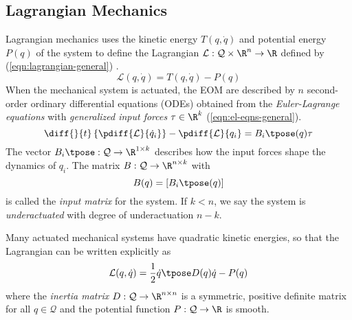 \subsection{Lagrangian Mechanics}

Lagrangian mechanics uses the kinetic energy \(T(q,\dot{q})\) and potential
energy \(P(q)\) of the system to define the Lagrangian 
\(\mathcal{L} : \mathcal{Q}\times\R^n \rightarrow \R\) defined by
(\ref{eqn:lagrangian-general}) \cite{greenwood_dynamics}.
\begin{equation}\label{eqn:lagrangian-general}
    \mathcal{L}(q,\dot{q}) = T(q,\dot{q}) - P(q)
\end{equation}
When the mechanical system is actuated, the EOM are described by \(n\) second-order
ordinary differential equations (ODEs) obtained from the \textit{Euler-Lagrange
equations} with \textit{generalized input forces} \(\tau \in \R^k\) 
(\ref{eqn:el-eqns-general}). 
\begin{equation}\label{eqn:el-eqns-general}
    \diff{}{t}\left\{ \pdiff{\mathcal{L}}{\dot{q}_i} \right\}
    - \pdiff{\mathcal{L}}{q_i} = B_i\tpose(q) \tau
\end{equation}
The vector \(B_i\tpose: \mathcal{Q} \rightarrow \R^{1\times k}\) describes how
the input forces shape the dynamics of \(q_i\).
The matrix  \(B: \mathcal{Q} \rightarrow \R^{n \times k}\) with
\[
    B(q) = [B_i\tpose(q)]
\]
is called the \textit{input matrix} for the system.
If \(k < n\), we say the system is \textit{underactuated} with degree of
underactuation \(n - k\).

Many actuated mechanical systems have quadratic kinetic energies, so that the
Lagrangian can be written explicitly as
\begin{equation}\label{eqn:lagrangian}
    \mathcal{L}(q,\dot{q}) = \frac{1}{2} \dot{q}\tpose D(q) \dot{q} - P(q)
\end{equation}
where the \textit{inertia matrix} \(D: \mathcal{Q} \rightarrow \R^{n\times n}\) 
is a symmetric, positive definite matrix for all \(q \in \mathcal{Q}\) and the
potential function \(P : \mathcal{Q} \rightarrow \R\) is smooth. 

